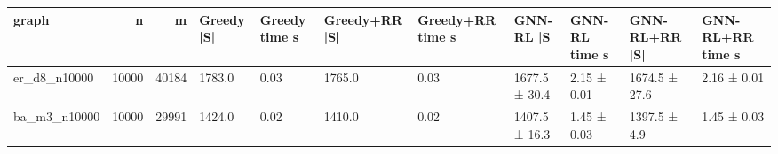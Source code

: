 \begin{tabular}{lrrllllllll}
\toprule
graph & n & m & Greedy |S| & Greedy time s & Greedy+RR |S| & Greedy+RR time s & GNN-RL |S| & GNN-RL time s & GNN-RL+RR |S| & GNN-RL+RR time s \\
\midrule
er\_d8\_n10000 & 10000 & 40184 & 1783.0 & 0.03 & 1765.0 & 0.03 & 1677.5 ± 30.4 & 2.15 ± 0.01 & 1674.5 ± 27.6 & 2.16 ± 0.01 \\
ba\_m3\_n10000 & 10000 & 29991 & 1424.0 & 0.02 & 1410.0 & 0.02 & 1407.5 ± 16.3 & 1.45 ± 0.03 & 1397.5 ± 4.9 & 1.45 ± 0.03 \\
\bottomrule
\end{tabular}

